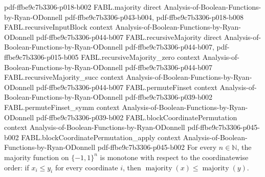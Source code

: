 \begin{theorem}
{    pdf-ffbe9c7b3306-p018-b002}
\proofstep
  {FABL.majority}
  {direct}
  {Analysis-of-Boolean-Functions-by-Ryan-ODonnell}
  {pdf-ffbe9c7b3306-p043-b004,
    pdf-ffbe9c7b3306-p018-b008}
\proofstep
  {FABL.recursiveInputBlock}
  {context}
  {Analysis-of-Boolean-Functions-by-Ryan-ODonnell}
  {pdf-ffbe9c7b3306-p044-b007}
\proofstep
  {FABL.recursiveMajority}
  {direct}
  {Analysis-of-Boolean-Functions-by-Ryan-ODonnell}
  {pdf-ffbe9c7b3306-p044-b007,
    pdf-ffbe9c7b3306-p015-b005}
\proofstep
  {FABL.recursiveMajority_zero}
  {context}
  {Analysis-of-Boolean-Functions-by-Ryan-ODonnell}
  {pdf-ffbe9c7b3306-p044-b007}
\proofstep
  {FABL.recursiveMajority_succ}
  {context}
  {Analysis-of-Boolean-Functions-by-Ryan-ODonnell}
  {pdf-ffbe9c7b3306-p044-b007}
\proofstep
  {FABL.permuteFinset}
  {context}
  {Analysis-of-Boolean-Functions-by-Ryan-ODonnell}
  {pdf-ffbe9c7b3306-p039-b002}
\proofstep
  {FABL.permuteFinset_symm}
  {context}
  {Analysis-of-Boolean-Functions-by-Ryan-ODonnell}
  {pdf-ffbe9c7b3306-p039-b002}
\proofstep
  {FABL.blockCoordinatePermutation}
  {context}
  {Analysis-of-Boolean-Functions-by-Ryan-ODonnell}
  {pdf-ffbe9c7b3306-p045-b002}
\proofstep
  {FABL.blockCoordinatePermutation_apply}
  {context}
  {Analysis-of-Boolean-Functions-by-Ryan-ODonnell}
  {pdf-ffbe9c7b3306-p045-b002}
For every $n\in\mathbb N$, the majority function on $\{-1,1\}^n$ is monotone with
respect to the coordinatewise order: if $x_i\le y_i$ for every coordinate $i$, then
$\operatorname{majority}(x)\le\operatorname{majority}(y)$.
\end{theorem}

